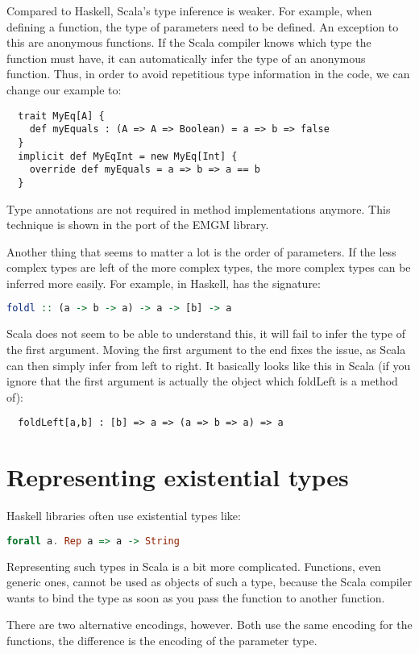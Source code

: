 Compared to Haskell, Scala's type inference is weaker. For example, when
defining a function, the type of parameters need to be defined. An exception
to this are anonymous functions. If the Scala compiler knows which type the
function must have, it can automatically infer the type of an anonymous
function. Thus, in order to avoid repetitious type information in the code,
we can change our  example to:
\begin{lstlisting}
  trait MyEq[A] {
    def myEquals : (A => A => Boolean) = a => b => false
  }
  implicit def MyEqInt = new MyEq[Int] {
    override def myEquals = a => b => a == b
  }
\end{lstlisting}
Type annotations are not required in method implementations anymore. This
technique is shown in the port of the EMGM library.

Another thing that seems to matter a lot is the order of parameters. If
the less complex types are left of the more complex types, the more
complex types can be inferred more easily. For example, in Haskell,
 has the signature:
\begin{lstlisting}[language=Haskell]
  foldl :: (a -> b -> a) -> a -> [b] -> a
\end{lstlisting}
Scala does not seem to be able to understand this, it will fail to
infer the type of the first argument. Moving the first argument to
the end fixes the issue, as Scala can then simply infer from left
to right. It basically looks like this in Scala (if you ignore that
the first argument is actually the object which foldLeft is a method
of):
\begin{lstlisting}
  foldLeft[a,b] : [b] => a => (a => b => a) => a
\end{lstlisting}

\section{Representing existential types}
\label{existential}
Haskell libraries often use existential types like:
\begin{lstlisting}[language=Haskell]
  forall a. Rep a => a -> String
\end{lstlisting}
Representing such types in Scala is a bit more complicated. Functions, even
generic ones, cannot be used as objects of such a type, because the Scala
compiler wants to bind the  type as soon as you pass the function to
another function.

There are two alternative encodings, however. Both use the same encoding for
the functions, the difference is the encoding of the parameter type.


